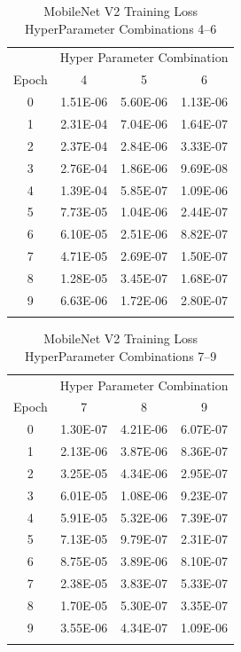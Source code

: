 \documentclass[10pt, conference]{IEEEtran}
\begin{document}
\begin{table}[H]
    \centering
    \begin{tabular}{@{}cccc@{}}
        \toprule
        & \multicolumn{3}{c}{Hyper Parameter Combination} \\
        \cmidrule{2-4}
            Epoch  & 4 & 5 & 6\\
        \midrule

        0 & 1.51E-06 & 5.60E-06 & 1.13E-06 \\
        1 & 2.31E-04 & 7.04E-06 & 1.64E-07 \\
        2 & 2.37E-04 & 2.84E-06 & 3.33E-07 \\
        3 & 2.76E-04 & 1.86E-06 & 9.69E-08 \\
        4 & 1.39E-04 & 5.85E-07 & 1.09E-06 \\
        5 & 7.73E-05 & 1.04E-06 & 2.44E-07 \\
        6 & 6.10E-05 & 2.51E-06 & 8.82E-07 \\
        7 & 4.71E-05 & 2.69E-07 & 1.50E-07 \\
        8 & 1.28E-05 & 3.45E-07 & 1.68E-07 \\
        9 & 6.63E-06 & 1.72E-06 & 2.80E-07 \\

        \bottomrule\smallskip
    \end{tabular}
    \caption{MobileNet V2 Training Loss HyperParameter Combinations 4--6}%
    \label{table:MobileNetV2TrainingLoss4-6}
\end{table}


\begin{table}[H]
    \centering
    \begin{tabular}{@{}cccc@{}}
        \toprule
        & \multicolumn{3}{c}{Hyper Parameter Combination} \\
        \cmidrule{2-4}
            Epoch  & 7 & 8 & 9\\
        \midrule

        0 & 1.30E-07 & 4.21E-06 & 6.07E-07 \\
        1 & 2.13E-06 & 3.87E-06 & 8.36E-07 \\
        2 & 3.25E-05 & 4.34E-06 & 2.95E-07 \\
        3 & 6.01E-05 & 1.08E-06 & 9.23E-07 \\
        4 & 5.91E-05 & 5.32E-06 & 7.39E-07 \\
        5 & 7.13E-05 & 9.79E-07 & 2.31E-07 \\
        6 & 8.75E-05 & 3.89E-06 & 8.10E-07 \\
        7 & 2.38E-05 & 3.83E-07 & 5.33E-07 \\
        8 & 1.70E-05 & 5.30E-07 & 3.35E-07 \\
        9 & 3.55E-06 & 4.34E-07 & 1.09E-06 \\

        \bottomrule\smallskip
    \end{tabular}
    \caption{MobileNet V2 Training Loss HyperParameter Combinations 7--9}%
    \label{table:MobileNetV2TrainingLoss7-9}
\end{table}
\end{document}

